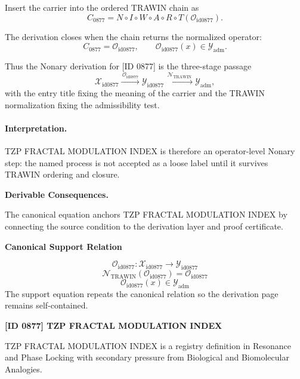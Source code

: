 Insert the carrier into the ordered TRAWIN chain as\[
C_{0877}=N\circ I\circ W\circ A\circ R\circ T(\mathcal{O}_{\mathrm{id0877}}).
\]

The derivation closes when the chain returns the normalized operator:\[
C_{0877}=\mathcal{O}_{\mathrm{id0877}},\qquad \mathcal{O}_{\mathrm{id0877}}(x)\in\mathcal{Y}_{\mathrm{adm}}.
\]

Thus the Nonary derivation for [ID 0877] is the three-stage passage
\[
\mathcal{X}_{\mathrm{id0877}}\xrightarrow{\,\mathcal{O}_{\mathrm{id0877}}\,} \mathcal{Y}_{\mathrm{id0877}}\xrightarrow{\,\mathcal{N}_{\mathrm{TRAWIN}}\,} \mathcal{Y}_{\mathrm{adm}},
\]
with the entry title fixing the meaning of the carrier and the TRAWIN normalization fixing the admissibility test.

\paragraph{Interpretation.} TZP FRACTAL MODULATION INDEX is therefore an operator-level Nonary step: the named process is not accepted as a loose label until it survives TRAWIN ordering and closure.

\par\vspace{0.35em}
\noindent\textbf{Derivable Consequences.}\quad
\begingroup
\footnotesize
\raggedright
The canonical equation anchors TZP FRACTAL MODULATION INDEX by connecting the source condition to the derivation layer and proof certificate.
\par\endgroup

\noindent\textbf{Canonical Support Relation}\par
\[
\mathcal{O}_{\mathrm{id0877}}:\mathcal{X}_{\mathrm{id0877}}\longrightarrow\mathcal{Y}_{\mathrm{id0877}}
\]
\[
\mathcal{N}_{\mathrm{TRAWIN}}(\mathcal{O}_{\mathrm{id0877}})=\mathcal{O}_{\mathrm{id0877}}
\]
\[
\mathcal{O}_{\mathrm{id0877}}(x)\in\mathcal{Y}_{\mathrm{adm}}
\]
\noindent The support equation repeats the canonical relation so the derivation page remains self-contained.\par

\clearpage
\noindent\textbf{[ID 0877] TZP FRACTAL MODULATION INDEX}\par
\vspace{0.35em}
\begingroup\small
{}
TZP FRACTAL MODULATION INDEX is a registry definition in Resonance and Phase Locking with secondary pressure from Biological and Biomolecular Analogies.

